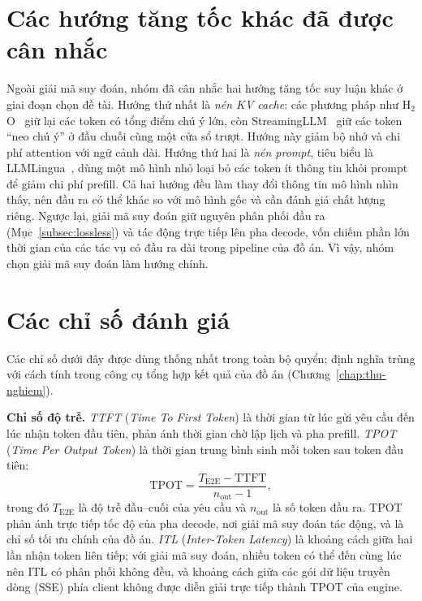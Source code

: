 \section{Các hướng tăng tốc khác đã được cân nhắc}
\label{sec:huong-khac}

Ngoài giải mã suy đoán, nhóm đã cân nhắc hai hướng tăng tốc suy luận khác ở giai đoạn chọn đề tài. Hướng thứ nhất là \textit{nén KV cache}: các phương pháp như H$_2$O~\cite{zhang2023h2o} giữ lại các token có tổng điểm chú ý lớn, còn StreamingLLM~\cite{xiao2024streamingllm} giữ các token ``neo chú ý'' ở đầu chuỗi cùng một cửa sổ trượt. Hướng này giảm bộ nhớ và chi phí attention với ngữ cảnh dài. Hướng thứ hai là \textit{nén prompt}, tiêu biểu là LLMLingua~\cite{jiang2023llmlingua}, dùng một mô hình nhỏ loại bỏ các token ít thông tin khỏi prompt để giảm chi phí prefill. Cả hai hướng đều làm thay đổi thông tin mô hình nhìn thấy, nên đầu ra có thể khác so với mô hình gốc và cần đánh giá chất lượng riêng. Ngược lại, giải mã suy đoán giữ nguyên phân phối đầu ra (Mục~\ref{subsec:lossless}) và tác động trực tiếp lên pha decode, vốn chiếm phần lớn thời gian của các tác vụ có đầu ra dài trong pipeline của đồ án. Vì vậy, nhóm chọn giải mã suy đoán làm hướng chính.

\section{Các chỉ số đánh giá}
\label{sec:chi-so}

Các chỉ số dưới đây được dùng thống nhất trong toàn bộ quyển; định nghĩa trùng với cách tính trong công cụ tổng hợp kết quả của đồ án (Chương~\ref{chap:thu-nghiem}).

\textbf{Chỉ số độ trễ.} \textit{TTFT} (\textit{Time To First Token}) là thời gian từ lúc gửi yêu cầu đến lúc nhận token đầu tiên, phản ánh thời gian chờ lập lịch và pha prefill. \textit{TPOT} (\textit{Time Per Output Token}) là thời gian trung bình sinh mỗi token sau token đầu tiên:
\begin{equation}\label{eq:tpot}
  \mathrm{TPOT} = \frac{T_{\text{E2E}} - \mathrm{TTFT}}{n_{\text{out}} - 1},
\end{equation}
trong đó $T_{\text{E2E}}$ là độ trễ đầu--cuối của yêu cầu và $n_{\text{out}}$ là số token đầu ra. TPOT phản ánh trực tiếp tốc độ của pha decode, nơi giải mã suy đoán tác động, và là chỉ số tối ưu chính của đồ án. \textit{ITL} (\textit{Inter-Token Latency}) là khoảng cách giữa hai lần nhận token liên tiếp; với giải mã suy đoán, nhiều token có thể đến cùng lúc nên ITL có phân phối không đều, và khoảng cách giữa các gói dữ liệu truyền dòng (SSE) phía client không được diễn giải trực tiếp thành TPOT của engine.

